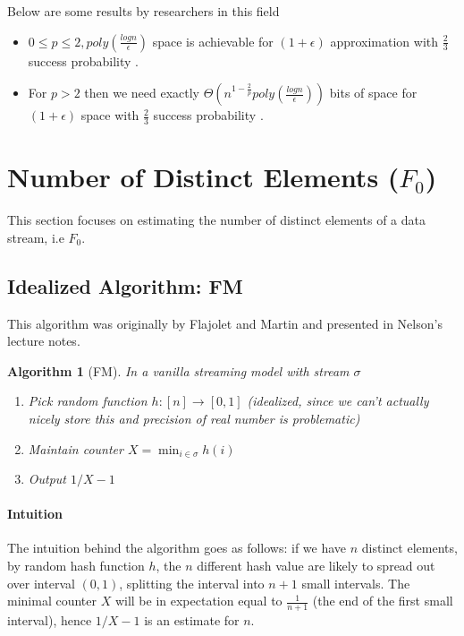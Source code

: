 \documentclass[11pt]{article}
\theoremstyle{plain}
\newtheorem{algorithm}{Algorithm}[section]
\begin{document}
Below are some results by researchers in this field
\begin{itemize} 
	\item $0 \leq p \leq 2, poly(\frac{logn}{\epsilon})$ space is achievable for 
	$(1+\epsilon)$ approximation with $\frac{2}{3}$ success probability 
	\cite{AMS99,Indyk2006-prg}.
	\item For $p >2$ then we need exactly $\Theta(n^{1-\frac{2}{p}} 
	poly(\frac{logn}{\epsilon}))$ bits of space for $(1+\epsilon)$ space with 
	$\frac{2}{3}$ success probability \cite{Bar-Yossef04,IndykW05}.
\end{itemize}




\section{Number of Distinct Elements ($F_0$)}
This section focuses on estimating the number of distinct elements of a data 
stream, i.e $F_0$. 

\subsection{Idealized Algorithm: FM}

This algorithm was originally by Flajolet and Martin  \cite{Flajolet85-f0} and 
presented in Nelson's lecture notes.

\begin{algorithm}[FM]
\label{al:fm}
In a vanilla streaming model with stream $\sigma$
\begin{enumerate}
	\item Pick random function $h: [n] \to [0,1]$ (idealized, since we can't 
	actually nicely store this and precision of real number is problematic)
	\item Maintain counter $X = \min_{i \in \sigma} h(i)$
	\item Output $1/X - 1$
\end{enumerate}
\end{algorithm}

\paragraph{Intuition} The intuition behind the algorithm goes as follows: if 
we have $n$ distinct elements, by random hash function $h$, the $n$ 
different hash value are likely to spread out over interval $(0,1)$, splitting the 
interval into $n+1$ small intervals. The minimal counter $X$ will be in 
expectation equal to $\frac{1}{n+1}$ (the end of the first small interval), 
hence  $1/X - 1$ is an estimate for $n$.
\end{document}
